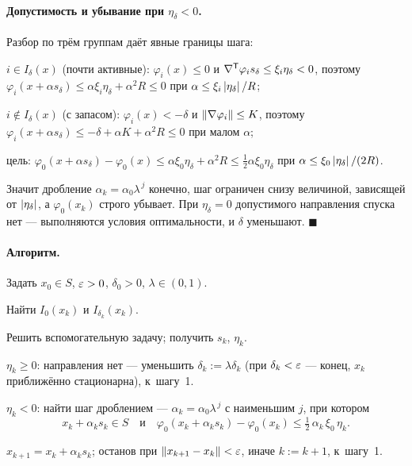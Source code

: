 \paragraph{Допустимость и убывание при $\eta_\delta < 0$.}
Разбор по трём группам даёт явные границы шага:
\begin{csteps}
  \item $i \in I_\delta(x)$ (почти активные): $\varphi_i(x) \le 0$ и
        $\nabla^{\mathsf{T}}\varphi_i s_\delta \le \xi_i\eta_\delta < 0$, поэтому
        $\varphi_i(x+\alpha s_\delta) \le \alpha\xi_i\eta_\delta + \alpha^2 R
         \le 0$ при $\alpha \le \xi_i\left\lvert \eta_\delta \right\rvert/R$;
  \item $i \notin I_\delta(x)$ (с запасом): $\varphi_i(x) < -\delta$ и
        $\left\lVert \nabla\varphi_i \right\rVert \le K$, поэтому
        $\varphi_i(x+\alpha s_\delta) \le -\delta + \alpha K + \alpha^2 R \le 0$
        при малом $\alpha$;
  \item цель: $\varphi_0(x+\alpha s_\delta) - \varphi_0(x)
        \le \alpha\xi_0\eta_\delta + \alpha^2 R
        \le \tfrac12\alpha\xi_0\eta_\delta$ при
        $\alpha \le \xi_0\left\lvert \eta_\delta \right\rvert/(2R)$.
\end{csteps}
Значит дробление $\alpha_k = \alpha_0\lambda^{\,j}$ конечно, шаг ограничен
снизу величиной, зависящей от $\left\lvert \eta_\delta \right\rvert$, а $\varphi_0(x_k)$ строго
убывает. При $\eta_\delta = 0$ допустимого направления спуска нет —
выполняются условия оптимальности, и $\delta$ уменьшают. $\blacksquare$

\paragraph{Алгоритм.}
Задать $x_0 \in S$, $\varepsilon > 0$, $\delta_0 > 0$, $\lambda \in (0,1)$.
\begin{csteps}
  \item Найти $I_0(x_k)$ и $I_{\delta_k}(x_k)$.
  \item Решить вспомогательную задачу; получить $s_k$, $\eta_k$.
  \item $\eta_k \ge 0$: направления нет — уменьшить $\delta_k := \lambda\delta_k$
        (при $\delta_k < \varepsilon$ — конец, $x_k$ приближённо стационарна),
        к~шагу~1.
  \item $\eta_k < 0$: найти шаг дроблением — $\alpha_k = \alpha_0\lambda^{\,j}$
        с наименьшим $j$, при котором
        \[
          x_k + \alpha_k s_k \in S
          \quad\text{и}\quad
          \varphi_0(x_k + \alpha_k s_k) - \varphi_0(x_k)
            \le \tfrac12\,\alpha_k\,\xi_0\,\eta_k .
        \]
  \item $x_{k+1} = x_k + \alpha_k s_k$; останов при
        $\left\lVert x_{k+1}-x_k \right\rVert < \varepsilon$, иначе $k := k+1$, к~шагу~1.
\end{csteps}

